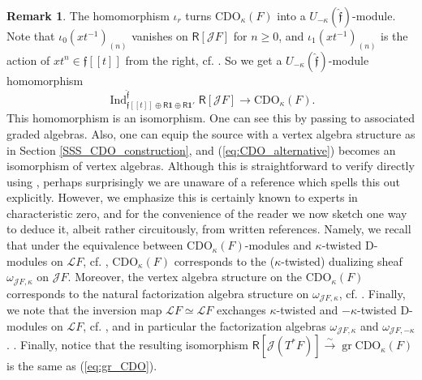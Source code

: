 \documentclass{amsart}
\theoremstyle{definition}
\newtheorem{Rem}[Thm]{Remark}
\newcommand{\Ring}{\mathsf{R}}
\newcommand{\gr}{\operatorname{gr}}
\newcommand{\Jet}{\mathscr{J}}
\newcommand{\Loop}{\mathscr{L}}
\newcommand{\CDO}{\mathrm{CDO}}
\numberwithin{equation}{section}
\begin{document}
\begin{Rem}\label{Rem:CDO_righthanded}
The homomorphism $\iota_r$ turns $\CDO_\kappa(F)$ into a $U_{-\kappa}(\hat{\mathfrak{f}})$-module. Note that $\iota_0(xt^{-1})_{(n)}$ vanishes on $\Ring[\Jet F]$ for $n\geqslant 0$, and $\iota_1(xt^{-1})_{(n)}$ is the action of $xt^n\in \mathfrak{f}[[t]]$ from the right, cf. \cite[Theorem 3.7(c)]{Arkhipov_Gaitsgory}. So we get a $U_{-\kappa}(\hat{\mathfrak{f}})$-module homomorphism 
\begin{equation}\label{eq:CDO_alternative}\operatorname{Ind}_{\mathfrak{f}[[t]]\oplus \Ring \mathbf{1}\oplus \Ring \mathbf{1}'}^{\hat{\mathfrak{f}}}\Ring[\Jet F]\rightarrow \CDO_\kappa(F).\end{equation}
This homomorphism is an isomorphism. One can see this by passing to associated graded algebras. Also, one can equip the source with a vertex algebra structure as in Section \ref{SSS_CDO_construction}, and (\ref{eq:CDO_alternative}) becomes an isomorphism
of vertex algebras. Although this is straightforward to verify directly using \cite[Theorem 3.7(c)]{Arkhipov_Gaitsgory}, perhaps surprisingly we are unaware of a reference which spells this out explicitly. However, we emphasize this is certainly known to experts in characteristic zero, and for the convenience of the reader we now sketch one way to deduce it, albeit rather circuitously, from written references. Namely, we recall that under the equivalence between $\CDO_\kappa(F)$-modules and $\kappa$-twisted D-modules on $\Loop F$, cf. \cite[Appendix A]{Arkhipov_Gaitsgory}, $\CDO_\kappa(F)$ corresponds to the ($\kappa$-twisted) dualizing sheaf $\omega_{\Jet F, \kappa}$ on $\Jet F$. Moreover, the vertex algebra structure on the $\CDO_\kappa(F)$ corresponds to the natural factorization algebra structure on  $\omega_{\Jet F, \kappa}$, cf. \cite[Section 3.9]{Chiral_Algebras}. Finally, we note that the inversion map $\Loop F \simeq \Loop F$ exchanges $\kappa$-twisted and $-\kappa$-twisted D-modules on $\Loop F$, cf. \cite[Example 1.2]{Quantum_Langlands}, and in particular the factorization algebras $\omega_{\Jet F, \kappa}$ and $\omega_{\Jet F, -\kappa}$.
. 
Finally, notice that the resulting isomorphism $\Ring[\Jet(T^*F)]\xrightarrow{\sim} \gr \CDO_\kappa(F)$ is the same as (\ref{eq:gr_CDO}).
\end{Rem}
\end{document}
